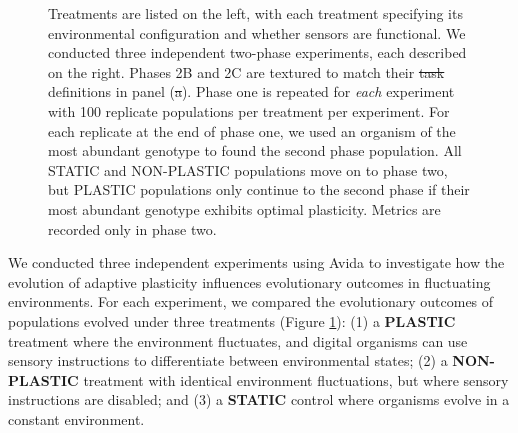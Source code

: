 \documentclass[utf8]{frontiersSCNS} %
\providecommand{\DIFaddtex}[1]{{\protect\color{blue}\uwave{#1}}} %
\providecommand{\DIFdeltex}[1]{{\protect\color{red}\sout{#1}}}                      %
\providecommand{\DIFaddFL}[1]{\DIFadd{#1}} %
\providecommand{\DIFdelFL}[1]{\DIFdel{#1}} %
\providecommand{\DIFaddbeginFL}{} %
\providecommand{\DIFaddendFL}{} %
\providecommand{\DIFdelbeginFL}{} %
\providecommand{\DIFdelendFL}{} %
\providecommand{\DIFadd}[1]{\texorpdfstring{\DIFaddtex{#1}}{#1}} %
\providecommand{\DIFdel}[1]{\texorpdfstring{\DIFdeltex{#1}}{}} %
\newcommand{\DIFscaledelfig}{0.5}
\newlength{\DIFdelgraphicswidth} %
\newlength{\DIFdelgraphicsheight} %
\newcommand{\DIFaddincludegraphics}[2][]{{\color{blue}\fbox{\DIFOincludegraphics[#1]{#2}}}} %
\newcommand{\DIFdelincludegraphics}[2][]{%
\sbox{\DIFdelgraphicsbox}{\DIFOincludegraphics[#1]{#2}}%
\settoboxwidth{\DIFdelgraphicswidth}{\DIFdelgraphicsbox} %
\settoboxtotalheight{\DIFdelgraphicsheight}{\DIFdelgraphicsbox} %
\scalebox{\DIFscaledelfig}{%
\parbox[b]{\DIFdelgraphicswidth}{\usebox{\DIFdelgraphicsbox}\\[-\baselineskip] \rule{\DIFdelgraphicswidth}{0em}}\llap{\resizebox{\DIFdelgraphicswidth}{\DIFdelgraphicsheight}{%
\setlength{\unitlength}{\DIFdelgraphicswidth}%
\begin{picture}(1,1)%
\thicklines\linethickness{2pt} %
{\color[rgb]{1,0,0}\put(0,0){\framebox(1,1){}}}%
{\color[rgb]{1,0,0}\put(0,0){\line( 1,1){1}}}%
{\color[rgb]{1,0,0}\put(0,1){\line(1,-1){1}}}%
\end{picture}%
}\hspace*{3pt}}} %
} %
\DeclareRobustCommand{\DIFaddbeginFL}{\DIFOaddbeginFL \let\includegraphics\DIFaddincludegraphics} %
\DeclareRobustCommand{\DIFaddendFL}{\DIFOaddendFL \let\includegraphics\DIFOincludegraphics} %
\DeclareRobustCommand{\DIFdelbeginFL}{\DIFOdelbeginFL \let\includegraphics\DIFdelincludegraphics} %
\DeclareRobustCommand{\DIFdelendFL}{\DIFOaddendFL \let\includegraphics\DIFOincludegraphics} %
\begin{document}
\begin{raggedbottom}
\begin{figure}[h!]
{  Treatments are listed on the left, with each treatment specifying its environmental configuration and whether sensors are functional.
  We conducted three independent two-phase experiments, each described on the right.
  Phases 2B and 2C are textured to match their \DIFdelbeginFL \DIFdelFL{task }\DIFdelendFL \DIFaddbeginFL \DIFaddFL{function }\DIFaddendFL definitions in panel (\DIFdelbeginFL \DIFdelFL{a}\DIFdelendFL \DIFaddbeginFL \DIFaddFL{b}\DIFaddendFL ).
  Phase one is repeated for \textit{each} experiment with 100 replicate populations per treatment per experiment.
  For each replicate at the end of phase one, we used an organism of the most abundant genotype to found the second phase population.
  All STATIC and NON-PLASTIC populations move on to phase two, but PLASTIC populations only continue to the second phase if their most abundant genotype exhibits optimal plasticity.
  Metrics are recorded only in phase two.
  }
  \label{fig:experimental-design}
\end{figure}


We conducted three independent experiments using Avida to investigate how the evolution of adaptive plasticity influences evolutionary outcomes in fluctuating environments.
For each experiment, we compared the evolutionary outcomes of populations evolved under three treatments (Figure \ref{fig:experimental-design}):
(1) a \textbf{PLASTIC} treatment where the environment fluctuates, and digital organisms can use sensory instructions to differentiate between environmental states;
(2) a \textbf{NON-PLASTIC} treatment with identical environment fluctuations, but where sensory instructions are disabled;
and (3) a \textbf{STATIC} control where organisms evolve in a constant environment.


\end{raggedbottom}
\end{document}
